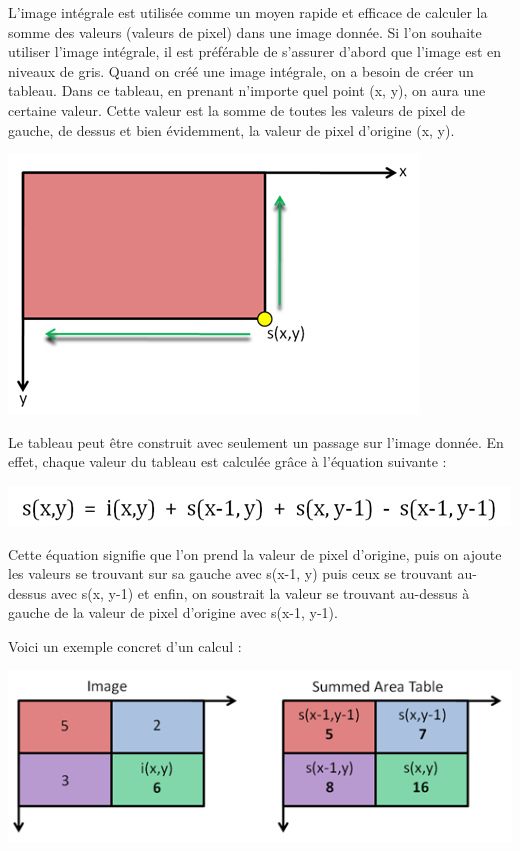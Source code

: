 \documentclass[12pt,a4paper]{article}
\begin{document}
L'image intégrale est utilisée comme un moyen rapide et efficace de calculer la somme des valeurs (valeurs de pixel) dans une image donnée.
Si l'on souhaite utiliser l'image intégrale, il est préférable de s'assurer d'abord que l'image est en niveaux de gris.
Quand on créé une image intégrale, on a besoin de créer un tableau. Dans ce tableau, en prenant n'importe quel point (x, y), on aura une certaine valeur. Cette valeur est la somme de toutes les valeurs de pixel de gauche, de dessus et bien évidemment, la valeur de pixel d'origine (x, y).

\begin{center}
\includegraphics[scale=.7]{Pictures/integrale1.png}
\end{center}

Le tableau peut être construit avec seulement un passage sur l'image donnée. En effet, chaque valeur du tableau est calculée grâce à l'équation suivante : 

\begin{center}
\includegraphics[scale=.7]{Pictures/integrale2.png}
\end{center}

Cette équation signifie que l'on prend la valeur de pixel d'origine, puis on ajoute les valeurs se trouvant sur sa gauche avec s(x-1, y) puis ceux se trouvant au-dessus avec s(x, y-1) et enfin, on soustrait la valeur se trouvant au-dessus à gauche de la valeur de pixel d'origine avec s(x-1, y-1).

Voici un exemple concret d'un calcul :

\begin{center}
\includegraphics[scale=.7]{Pictures/integrale3.png}
\end{center}
\end{document}
